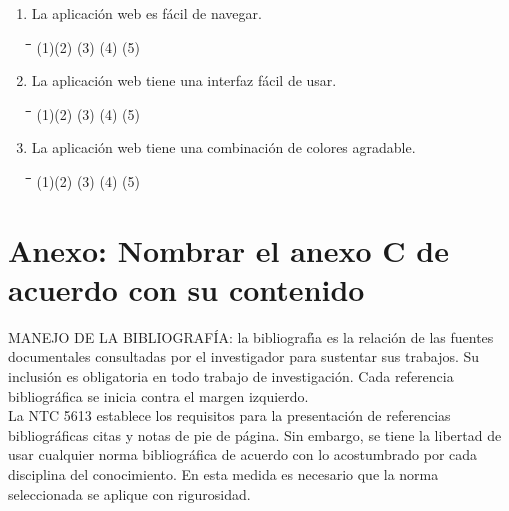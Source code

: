 \begin{appendix}
\begin{enumerate}
	\item La aplicación web es fácil de navegar.

\begin{tabbing}
	\hspace{2cm}\=\hspace{2cm}\=\hspace{2cm}\=\hspace{2cm}\=\kill
	(1)\>(2)  \>(3)  \>(4)  \>(5) 
\end{tabbing} 

	\item La aplicación web tiene una interfaz fácil de usar.

\begin{tabbing}
	\hspace{2cm}\=\hspace{2cm}\=\hspace{2cm}\=\hspace{2cm}\=\kill
	(1)\>(2)  \>(3)  \>(4)  \>(5) 
\end{tabbing} 

	\item La aplicación web tiene una combinación de colores agradable.

\begin{tabbing}
	\hspace{2cm}\=\hspace{2cm}\=\hspace{2cm}\=\hspace{2cm}\=\kill
	(1)\>(2)  \>(3)  \>(4)  \>(5) 
\end{tabbing} 

\end{enumerate}

\chapter{Anexo: Nombrar el anexo C de acuerdo con su contenido}
MANEJO DE LA BIBLIOGRAF\'{I}A: la bibliograf\'{\i}a es la relaci\'{o}n de las fuentes documentales consultadas por el investigador para sustentar sus trabajos. Su inclusi\'{o}n es obligatoria en todo trabajo de investigaci\'{o}n. Cada referencia bibliogr\'{a}fica se inicia contra el margen izquierdo.\\

La NTC 5613 establece los requisitos para la presentaci\'{o}n de referencias bibliogr\'{a}ficas citas y notas de pie de p\'{a}gina. Sin embargo, se tiene la libertad de usar cualquier norma bibliogr\'{a}fica de acuerdo con lo acostumbrado por cada disciplina del conocimiento. En esta medida es necesario que la norma seleccionada se aplique con rigurosidad.\\


\end{appendix}
